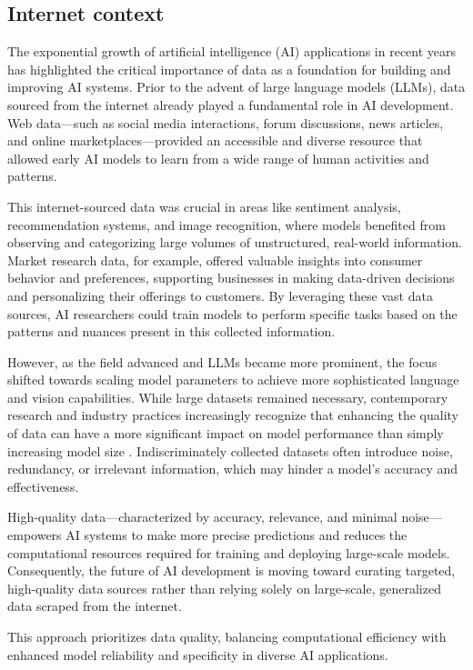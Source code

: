 \subsection{Internet context}
The exponential growth of artificial intelligence (AI) applications in recent years has highlighted the critical importance of data as a foundation for building and improving AI systems. Prior to the advent of large language models (LLMs), data sourced from the internet already played a fundamental role in AI development. Web data—such as social media interactions, forum discussions, news articles, and online marketplaces—provided an accessible and diverse resource that allowed early AI models to learn from a wide range of human activities and patterns.

This internet-sourced data was crucial in areas like sentiment analysis, recommendation systems, and image recognition, where models benefited from observing and categorizing large volumes of unstructured, real-world information. Market research data, for example, offered valuable insights into consumer behavior and preferences, supporting businesses in making data-driven decisions and personalizing their offerings to customers. By leveraging these vast data sources, AI researchers could train models to perform specific tasks based on the patterns and nuances present in this collected information.

However, as the field advanced and LLMs became more prominent, the focus shifted towards scaling model parameters to achieve more sophisticated language and vision capabilities. While large datasets remained necessary, contemporary research and industry practices increasingly recognize that enhancing the quality of data can have a more significant impact on model performance than simply increasing model size \cite{bigdatawire2024}. Indiscriminately collected datasets often introduce noise, redundancy, or irrelevant information, which may hinder a model’s accuracy and effectiveness.

High-quality data—characterized by accuracy, relevance, and minimal noise—empowers AI systems to make more precise predictions and reduces the computational resources required for training and deploying large-scale models. Consequently, the future of AI development is moving toward curating targeted, high-quality data sources rather than relying solely on large-scale, generalized data scraped from the internet. 

This approach prioritizes data quality, balancing computational efficiency with enhanced model reliability and specificity in diverse AI applications.


